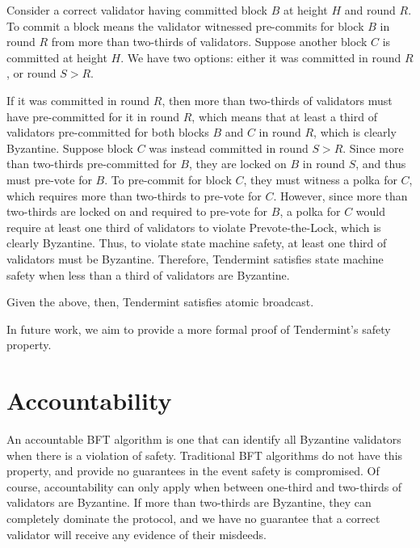 Consider a correct validator having committed block $B$ at height $H$ and round $R$.
To commit a block means the validator witnessed pre-commits 
for block $B$ in round $R$ from more than two-thirds of validators.
Suppose another block $C$ is committed at height $H$. 
We have two options: either it was committed in round $R$, or round $S > R$.

If it was committed in round $R$, then more than two-thirds of validators
must have pre-committed for it in round $R$, which means that at least a third of validators 
pre-committed for both blocks $B$ and $C$ in round $R$, which is clearly Byzantine.
Suppose block $C$ was instead committed in round $S > R$.
Since more than two-thirds pre-committed for $B$, they are locked on $B$ in round $S$,
and thus must pre-vote for $B$. To pre-commit for block $C$, they must 
witness a polka for $C$, which requires more than two-thirds to pre-vote for $C$.
However, since more than two-thirds are locked on and required to pre-vote for $B$,
a polka for $C$ would require at least one third of validators to violate Prevote-the-Lock,
which is clearly Byzantine.
Thus, to violate state machine safety, at least one third of validators must be Byzantine.
Therefore, Tendermint satisfies state machine safety when less than a third of validators are Byzantine.

Given the above, then, Tendermint satisfies atomic broadcast.

In future work, we aim to provide a more formal proof of Tendermint's safety property.

%
%
%


\section{Accountability}

An accountable BFT algorithm is one that can identify all Byzantine validators 
when there is a violation of safety. 
Traditional BFT algorithms do not have this property,
and provide no guarantees in the event safety is compromised.
Of course, accountability can only apply when between one-third and two-thirds of
validators are Byzantine.
If more than two-thirds are Byzantine, they can completely dominate the protocol,
and we have no guarantee that a correct validator will receive any evidence of their misdeeds.

